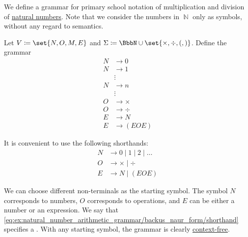 \begin{example}\label{ex:natural_number_arithmetic_grammar/backus_naur_form}
  We define a grammar for primary school notation of multiplication and division of \hyperref[def:set_of_natural_numbers]{natural numbers}. Note that we consider the numbers in \( \BbbN \) only as symbols, without any regard to semantics.

  Let \( V \coloneqq \set{ N, O, M, E } \) and \( \Sigma \coloneqq \BbbN \cup \set{ \times, \div, (, ) } \). Define the grammar
  \begin{equation}\label{eq:ex:natural_number_arithmetic_grammar/backus_naur_form/simple}
    \begin{aligned}
      N &\to 0 \\
      N &\to 1 \\
      \phantom{N} &\vdots \\
      N &\to n \\
      \phantom{N} &\vdots \\
      O &\to \times \\
      O &\to \div \\
      E &\to N \\
      E &\to (E O E)
    \end{aligned}
  \end{equation}

  It is convenient to use the following shorthands:
  \begin{equation}\label{eq:ex:natural_number_arithmetic_grammar/backus_naur_form/shorthand}
    \begin{aligned}
      N &\to 0 \mid 1 \mid 2 \mid \ldots \\
      O &\to \times \mid \div \\
      E &\to N \mid (E O E)
    \end{aligned}
  \end{equation}

  We can choose different non-terminals as the starting symbol. The symbol \( N \) corresponds to numbers, \( O \) corresponds to operations, and \( E \) can be either a number or an expression. We say that \eqref{eq:ex:natural_number_arithmetic_grammar/backus_naur_form/shorthand} specifies a . With any starting symbol, the grammar is clearly \hyperref[def:chomsky_hierarchy]{context-free}.
\end{example}

